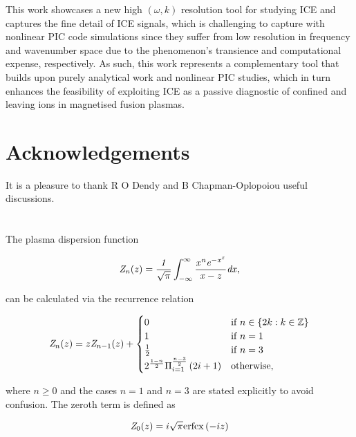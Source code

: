 \documentclass[12pt]{iopart}
\begin{document}
This work showcases a new high $(\omega,k)$ resolution tool for studying ICE and captures the fine detail of ICE signals, which is challenging to capture with nonlinear PIC code simulations since they suffer from low resolution in frequency and wavenumber space due to the phenomenon's transience and computational expense, respectively. As such, this work represents a complementary tool that builds upon purely analytical work and nonlinear PIC studies, which in turn enhances the feasibility of exploiting ICE as a passive diagnostic of confined and leaving ions in magnetised fusion plasmas.

\section{Acknowledgements}

It is a pleasure to thank R O Dendy and B Chapman-Oplopoiou useful discussions.

\appendix

\section{}

The plasma dispersion function\cite{Fried1961}

\begin{equation}
\it{Z}_n(z)=\frac{1}{\sqrt{\pi}}\int_{-\infty}^{\infty}\frac{x^n e^{-x^2}}{x-z}dx,
\end{equation}

\noindent can be calculated via the recurrence relation\cite{Sampoorna2007}

\begin{equation}
{\it Z}_n(z) = z {\it Z}_{n-1}(z) + \begin{cases}
0 & \text{if } n \in \{2k : k \in \mathbb{Z}\}
\\
1 & \text{if } n = 1
\\
\frac{1}{2} & \text{if } n = 3
\\
2^{\frac{1-n}{2}} \Pi_{i=1}^{\frac{n-3}{2}} \left( 2i + 1 \right) & \text{otherwise},
\end{cases}
\end{equation}

\noindent where $n \geq 0$ and the cases $n=1$ and $n=3$ are stated explicitly to avoid confusion. The zeroth term is defined as

\begin{equation}
 {\it Z}_0(z) = i \sqrt{\pi} \mathrm{erfcx} \left(-i z \right)
\end{equation}
\end{document}
